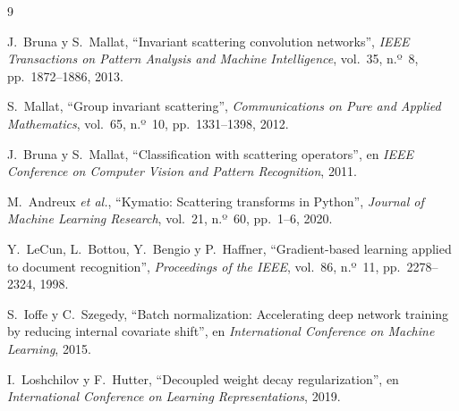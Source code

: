 \documentclass[twocolumn,10pt,a4paper]{article}
\begin{document}
\begin{thebibliography}{9}
\small

J.~Bruna y S.~Mallat,
\newblock ``Invariant scattering convolution networks'',
\newblock \emph{IEEE Transactions on Pattern Analysis and Machine
Intelligence}, vol.~35, n.º~8, pp.~1872--1886, 2013.

S.~Mallat,
\newblock ``Group invariant scattering'',
\newblock \emph{Communications on Pure and Applied Mathematics}, vol.~65,
n.º~10, pp.~1331--1398, 2012.

J.~Bruna y S.~Mallat,
\newblock ``Classification with scattering operators'',
\newblock en \emph{IEEE Conference on Computer Vision and Pattern Recognition},
2011.

M.~Andreux \emph{et al.},
\newblock ``Kymatio: Scattering transforms in Python'',
\newblock \emph{Journal of Machine Learning Research}, vol.~21, n.º~60,
pp.~1--6, 2020.

Y.~LeCun, L.~Bottou, Y.~Bengio y P.~Haffner,
\newblock ``Gradient-based learning applied to document recognition'',
\newblock \emph{Proceedings of the IEEE}, vol.~86, n.º~11, pp.~2278--2324, 1998.

S.~Ioffe y C.~Szegedy,
\newblock ``Batch normalization: Accelerating deep network training by reducing
internal covariate shift'',
\newblock en \emph{International Conference on Machine Learning}, 2015.

I.~Loshchilov y F.~Hutter,
\newblock ``Decoupled weight decay regularization'',
\newblock en \emph{International Conference on Learning Representations}, 2019.

\end{thebibliography}
\end{document}
